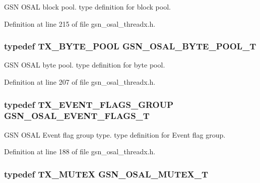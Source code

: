 GSN OSAL block pool. type definition for block pool. 



Definition at line 215 of file gsn\_\-osal\_\-threadx.h.

\hypertarget{a00628_gaf2af06408f9cf286dc400b5957264f00}{
\subsubsection[{GSN\_\-OSAL\_\-BYTE\_\-POOL\_\-T}]{\setlength{\rightskip}{0pt plus 5cm}typedef TX\_\-BYTE\_\-POOL {\bf GSN\_\-OSAL\_\-BYTE\_\-POOL\_\-T}}}
\label{a00628_gaf2af06408f9cf286dc400b5957264f00}


GSN OSAL byte pool. type definition for byte pool. 



Definition at line 207 of file gsn\_\-osal\_\-threadx.h.

\hypertarget{a00628_gab93fdfc637101a29260ca105d3eb924e}{
\subsubsection[{GSN\_\-OSAL\_\-EVENT\_\-FLAGS\_\-T}]{\setlength{\rightskip}{0pt plus 5cm}typedef TX\_\-EVENT\_\-FLAGS\_\-GROUP {\bf GSN\_\-OSAL\_\-EVENT\_\-FLAGS\_\-T}}}
\label{a00628_gab93fdfc637101a29260ca105d3eb924e}


GSN OSAL Event flag group type. type definition for Event flag group. 



Definition at line 188 of file gsn\_\-osal\_\-threadx.h.

\hypertarget{a00628_gae997291afc7166c897f459023e0154ad}{
\subsubsection[{GSN\_\-OSAL\_\-MUTEX\_\-T}]{\setlength{\rightskip}{0pt plus 5cm}typedef TX\_\-MUTEX {\bf GSN\_\-OSAL\_\-MUTEX\_\-T}}}
\label{a00628_gae997291afc7166c897f459023e0154ad}


